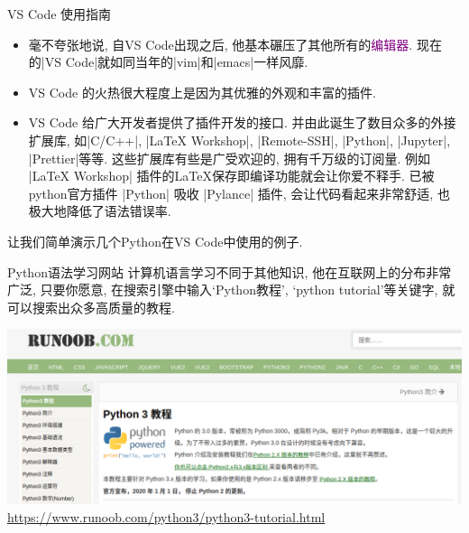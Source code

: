 \documentclass{beamer}
\newcommand{\purple}{\textcolor{purple}}
\begin{document}
    \begin{frame}[fragile]{VS Code 使用指南}
      \begin{block}{}
        \begin{itemize}
          \item  毫不夸张地说, 自VS Code出现之后, 他基本碾压了其他所有的\purple{编辑器}. 现在的\cverb|VS Code|就如同当年的\cverb|vim|和\cverb|emacs|一样风靡. 
          \item  VS Code 的火热很大程度上是因为其优雅的外观和丰富的插件.
          \item  VS Code 给广大开发者提供了插件开发的接口. 并由此诞生了数目众多的外接扩展库, 如\cverb|C/C++|, \cverb|LaTeX Workshop|, \cverb|Remote-SSH|, \cverb|Python|, \cverb|Jupyter|, \cverb|Prettier|等等. 这些扩展库有些是广受欢迎的, 拥有千万级的订阅量. 例如 \cverb|LaTeX Workshop| 插件的\LaTeX 保存即编译功能就会让你爱不释手. 已被python官方插件 \cverb|Python| 吸收 \cverb|Pylance| 插件, 会让代码看起来非常舒适, 也极大地降低了语法错误率. 
        \end{itemize}
      \end{block}
      \begin{block}{}
        让我们简单演示几个Python在VS Code中使用的例子.
      \end{block}
    \end{frame}

    \begin{frame}{Python语法学习网站}
      计算机语言学习不同于其他知识, 他在互联网上的分布非常广泛, 只要你愿意, 在搜索引擎中输入`Python教程', `python tutorial'等关键字, 就可以搜索出众多高质量的教程.
      \begin{block}{}
      
        \begin{center}
          \includegraphics[width=\textwidth]{figure/noob.png}
          \centering\purple{\small\url{https://www.runoob.com/python3/python3-tutorial.html}}
        \end{center}
      \end{block}
    \end{frame}
\end{document}
